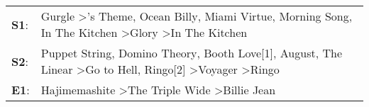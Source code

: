 \begin{supertabular}{p{0.03\textwidth}p{0.92\textwidth}}
 \textbf{S1}:  &                                Gurgle\textsuperscript{} \textgreater {}'s Theme\textsuperscript{}, \enspace Ocean Billy\textsuperscript{}, \enspace Miami Virtue\textsuperscript{}, \enspace Morning Song\textsuperscript{}, \enspace In The Kitchen\textsuperscript{} \textgreater \enspace Glory\textsuperscript{} \textgreater \enspace In The Kitchen\textsuperscript{}  \enspace  \\
 \textbf{S2}:  &  Puppet String\textsuperscript{}, \enspace Domino Theory\textsuperscript{}, \enspace Booth Love[1]\textsuperscript{}, \enspace August\textsuperscript{}, \enspace The Linear\textsuperscript{} \textgreater \enspace Go to Hell\textsuperscript{}, \enspace Ringo[2]\textsuperscript{} \textgreater \enspace Voyager\textsuperscript{} \textgreater \enspace Ringo\textsuperscript{}  \enspace  \\
 \textbf{E1}:  &                                                                                                                                                                                                                                          Hajimemashite\textsuperscript{} \textgreater \enspace The Triple Wide\textsuperscript{} \textgreater \enspace Billie Jean\textsuperscript{}  \enspace  \\
\end{supertabular}
